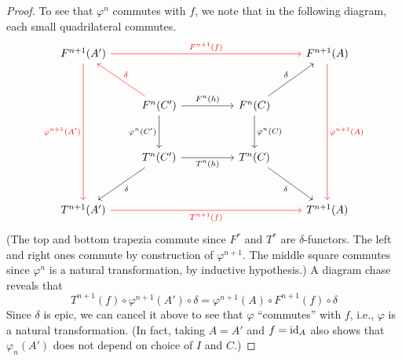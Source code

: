 \documentclass[12pt]{article}
\begin{document}
\begin{proof}
	To see that $\varphi^{n}$ commutes with $f$, we note that in the following diagram, each small quadrilateral commutes.
	\begin{equation} \label{eq:06}
		\begin{tikzcd}[row sep=3em]
		F^{n + 1}(A') \arrow[color=red, ddd, "\varphi^{n + 1}(A')"'] \arrow[color=red, rrrr, "F^{n + 1}(f)"] &                                                                                      &  &                                                           & F^{n + 1}(A) \arrow[color=red, ddd, "\varphi^{n + 1}(A)"] \\
		                                                                               & F^{n}(C') \arrow[color=red, lu, "\delta"'] \arrow[rr, "F^{n}(h)"] \arrow[d, "\varphi^{n}(C')"'] &  & F^{n}(C) \arrow[ru, "\delta"] \arrow[d, "\varphi^{n}(C)"] &                                                \\
		                                                                               & T^{n}(C') \arrow[rr, "T^{n}(h)"'] \arrow[ld, "\delta"]                               &  & T^{n}(C) \arrow[rd, "\delta"']                            &                                                \\
		T^{n + 1}(A') \arrow[color=red, rrrr, "T^{n + 1}(f)"']                                    &                                                                                      &  &                                                           & T^{n + 1}(A)                                  
		\end{tikzcd}
	\end{equation}
	(The top and bottom trapezia commute since $F^{\ast}$ and $T^{\ast}$ are $\delta$-functors. The left and right ones commute by construction of $\varphi^{n + 1}$. The middle square commutes since $\varphi^{n}$ is a natural transformation, by inductive hypothesis.) \newline
	A diagram chase reveals that
	\begin{equation*} 
		T^{n + 1}(f) \circ \varphi^{n + 1}(A') \circ \delta = \varphi^{n + 1}(A) \circ F^{n + 1}(f) \circ \delta
	\end{equation*}
	Since $\delta$ is epic, we can cancel it above to see that $\varphi$ ``commutes'' with $f$, i.e., $\varphi$ is a natural transformation. (In fact, taking $A = A'$ and $f = \operatorname{id}_{A}$ also shows that $\varphi_{n}(A')$ does not depend on choice of $I$ and $C$.)


\end{proof}
\end{document}
